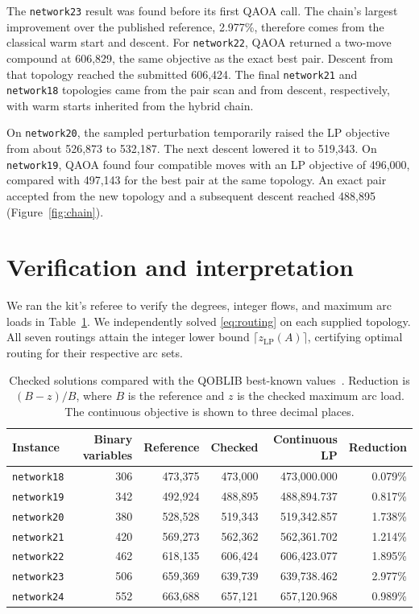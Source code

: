 \documentclass[a4paper]{article}
\begin{document}
The \texttt{network23} result was found before its first QAOA call. The chain's largest improvement over the
published reference, 2.977\%, therefore comes from the classical warm start and descent.
For \texttt{network22}, QAOA returned a two-move compound at 606,829, the same objective as the exact best pair.
Descent from that topology reached the submitted 606,424. The final \texttt{network21} and \texttt{network18}
topologies came from the pair scan and from descent, respectively, with warm starts inherited from the hybrid chain.

On \texttt{network20}, the sampled perturbation temporarily raised the LP objective from about 526,873 to 532,187.
The next descent lowered it to 519,343. On \texttt{network19}, QAOA found four compatible moves with an LP
objective of 496,000, compared with 497,143 for the best pair at the same topology. An exact pair accepted
from the new topology and a subsequent descent reached 488,895 (Figure~\ref{fig:chain}).

\clearpage
\section{Verification and interpretation}

We ran the kit's referee to verify the degrees, integer flows, and maximum arc loads in Table~\ref{tab:benchmark}.
We independently solved \eqref{eq:routing} on each supplied topology. All seven routings attain the integer
lower bound \(\lceil z_{\mathrm{LP}}(A)\rceil\), certifying optimal routing for their respective arc sets.

\begin{table}[htbp]
\centering
\caption{Checked solutions compared with the QOBLIB best-known values~\cite{qoblib}.
Reduction is \((B-z)/B\), where \(B\) is the reference and \(z\) is the checked maximum arc load.
The continuous objective is shown to three decimal places.}
\label{tab:benchmark}
\begin{tabular}{@{}lrrrrr@{}}
\toprule
Instance & Binary variables & Reference & Checked & Continuous LP & Reduction \\
\midrule
\texttt{network18} & 306 & 473,375 & 473,000 & 473,000.000 & 0.079\% \\
\texttt{network19} & 342 & 492,924 & 488,895 & 488,894.737 & 0.817\% \\
\texttt{network20} & 380 & 528,528 & 519,343 & 519,342.857 & 1.738\% \\
\texttt{network21} & 420 & 569,273 & 562,362 & 562,361.702 & 1.214\% \\
\texttt{network22} & 462 & 618,135 & 606,424 & 606,423.077 & 1.895\% \\
\texttt{network23} & 506 & 659,369 & 639,739 & 639,738.462 & 2.977\% \\
\texttt{network24} & 552 & 663,688 & 657,121 & 657,120.968 & 0.989\% \\
\bottomrule
\end{tabular}
\end{table}
\end{document}

